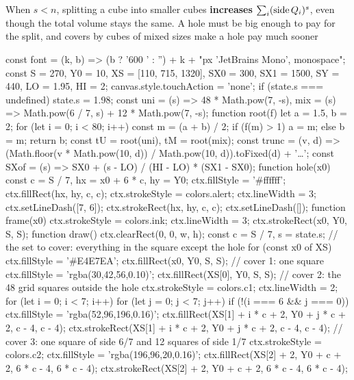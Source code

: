 When $s<n$, splitting a cube into smaller cubes \textbf{increases} $\sum_i(\operatorname{side} Q_i)^s$, even though the total volume stays the same. A hole must be big enough to pay for the split, and covers by cubes of mixed sizes make a hole pay much sooner
\begin{js}[size=1700x520, frames=1, alt="Interactive: a unit square with a hole of side 1/7 in one corner, covered three ways: by one square, by the 48 grid squares of side 1/7 outside the hole, and by one square of side 6/7 plus 12 squares of side 1/7; a slider sets s between 1.95 and 2, and each cover's sum of side lengths to the power s is shown"]
const font = (k, b) => (b ? '600 ' : '') + k + "px 'JetBrains Mono', monospace";
const S = 270, Y0 = 10, XS = [110, 715, 1320], SX0 = 300, SX1 = 1500, SY = 440, LO = 1.95, HI = 2;
canvas.style.touchAction = 'none';
if (state.s === undefined) state.s = 1.98;
const uni = (s) => 48 * Math.pow(7, -s), mix = (s) => Math.pow(6 / 7, s) + 12 * Math.pow(7, -s);
function root(f) { let a = 1.5, b = 2; for (let i = 0; i < 80; i++) { const m = (a + b) / 2; if (f(m) > 1) a = m; else b = m; } return b; }
const tU = root(uni), tM = root(mix);
const trunc = (v, d) => (Math.floor(v * Math.pow(10, d)) / Math.pow(10, d)).toFixed(d) + '…';
const SXof = (s) => SX0 + (s - LO) / (HI - LO) * (SX1 - SX0);
function hole(x0) {
  const c = S / 7, hx = x0 + 6 * c, hy = Y0;
  ctx.fillStyle = '#ffffff'; ctx.fillRect(hx, hy, c, c);
  ctx.strokeStyle = colors.alert; ctx.lineWidth = 3; ctx.setLineDash([7, 6]); ctx.strokeRect(hx, hy, c, c); ctx.setLineDash([]);
}
function frame(x0) { ctx.strokeStyle = colors.ink; ctx.lineWidth = 3; ctx.strokeRect(x0, Y0, S, S); }
function draw() {
  ctx.clearRect(0, 0, w, h);
  const c = S / 7, s = state.s;
  // the set to cover: everything in the square except the hole
  for (const x0 of XS) { ctx.fillStyle = '#E4E7EA'; ctx.fillRect(x0, Y0, S, S); }
  // cover 1: one square
  ctx.fillStyle = 'rgba(30,42,56,0.10)'; ctx.fillRect(XS[0], Y0, S, S);
  // cover 2: the 48 grid squares outside the hole
  ctx.strokeStyle = colors.c1; ctx.lineWidth = 2;
  for (let i = 0; i < 7; i++) for (let j = 0; j < 7; j++) if (!(i === 6 && j === 0)) { ctx.fillStyle = 'rgba(52,96,196,0.16)'; ctx.fillRect(XS[1] + i * c + 2, Y0 + j * c + 2, c - 4, c - 4); ctx.strokeRect(XS[1] + i * c + 2, Y0 + j * c + 2, c - 4, c - 4); }
  // cover 3: one square of side 6/7 and 12 squares of side 1/7
  ctx.strokeStyle = colors.c2; ctx.fillStyle = 'rgba(196,96,20,0.16)';
  ctx.fillRect(XS[2] + 2, Y0 + c + 2, 6 * c - 4, 6 * c - 4); ctx.strokeRect(XS[2] + 2, Y0 + c + 2, 6 * c - 4, 6 * c - 4);
}
\end{js}
